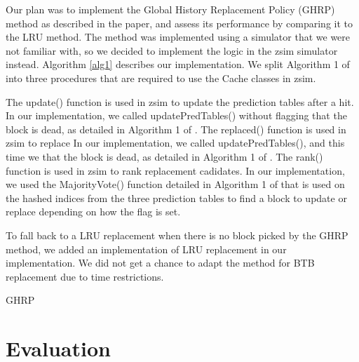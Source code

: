 \documentclass[11pt]{article}
\begin{document}
Our plan was to implement the Global History Replacement Policy (GHRP) method as described in the paper, and assess its performance by comparing it to the LRU method.
The method was implemented using a simulator that we were not familiar with, so we decided to implement the logic in the zsim simulator instead.
Algorithm \ref{alg1} describes our implementation. We split Algorithm 1 of \cite{samira-ISCA18} into three procedures that are required to use the Cache classes in zsim.\par

The update() function is used in zsim to update the prediction tables after a hit. In our implementation, we called updatePredTables() without flagging that the block is dead, as detailed in Algorithm 1 of \cite{samira-ISCA18}. 
The replaced() function is used in zsim to replace In our implementation, we called updatePredTables(), and this time we that the block is dead, as detailed in Algorithm 1 of \cite{samira-ISCA18}.
The rank() function is used in zsim to rank replacement cadidates. In our implementation, we used the MajorityVote() function detailed in Algorithm 1 of \cite{samira-ISCA18} that is used on the hashed indices from the three prediction tables to find a block to update or replace depending on how the flag is set.\par

To fall back to a LRU replacement when there is no block picked by the GHRP method, we added an implementation of LRU replacement in our implementation.
We did not get a chance to adapt the method for BTB replacement due to time restrictions.
\begin{algorithm}[h]
	\label{alg:alg1}
	\caption{GHRP}
	\begin{algorithmic}[1]
		\renewcommand{\algorithmicrequire}{\textbf{Input: PC}}
		\EndProcedure
		\EndProcedure
		\EndProcedure
	\end{algorithmic}
\end{algorithm}

\section{Evaluation}
\label{sec:Evaluation}
\end{document}
